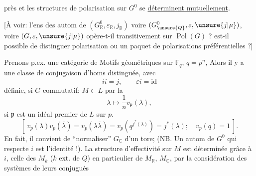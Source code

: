 près et les structures de polarisation sur $G^0$ se \uline{déterminent mutuellement}.

 [À voir: l'ens des autom de $(G^0_{\mathbb R},\varepsilon_{\mathbb R},j_{\mathbb R})$ voire $(G^0_{\unsure{Q}},\varepsilon,\unsure{j|\mu})$, voire $(G,\varepsilon,\unsure{j|\mu})$ opère-t-il transitivement sur $\operatorname{Pol}(G)$ ?  est-il possible  de distinguer    polarisation ou un paquet de polarisations préférentielles ?]

Prenons p.ex. une catégorie de Motifs géométriques sur $\mathbb F_q$, $q=p^n$,  Alors  il y a une classe de conjugaison d'homs
distinguée, avec
\[
\bar i i=j,\qquad\varepsilon i=\mathrm{id}
\]
définie,  si $G$ commutatif: $M\subset L$  par la
\[
\lambda\longmapsto\frac1n v_{\mathfrak p}(\lambda),
\]
si $\mathfrak p$ est un idéal premier de $L$ sur $p$.
\[
[\ v_p(\lambda)v_p(\bar\lambda)=v_p(\lambda\bar\lambda)=v_p(q^{j^*(\lambda)})=j^*(\lambda);\quad v_p(q)=1\ ].
\]
En fait, il convient de ``normaliser'' $G_{\mathbb C}$   d'un tore; (NB. Un autom de $G^0$ qui  respecte $i$ est l'identité !). La structure d'effectivité sur $M$ est déterminée grâce à $i$, celle des $M_k$ ($k$ ext. de $Q$) en particulier de $M_{\mathbb R}$, $M_{\mathbb C}$, par la considération des systèmes de leurs conjugués
